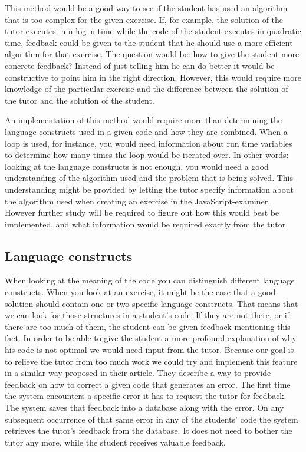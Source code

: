 \documentclass{article}
\begin{document}
This method would be a good way to see if the student has used an algorithm
that is too complex for the given exercise. If, for example, the solution of
the tutor executes in n-log~n time while the code of the student executes in
quadratic time, feedback could be given to the student that he should use a
more efficient algorithm for that exercise. The question would be: how to give
the student more concrete feedback? Instead of just telling him he can do
better it would be constructive to point him in the right direction. However,
this would require more knowledge of the particular exercise and the difference
between the solution of the tutor and the solution of the student.

An implementation of this method would require more than determining the
language constructs used in a given code and how they are combined. When a loop
is used, for instance, you would need information about run time variables to
determine how many times the loop would be iterated over. In other words:
looking at the language constructs is not enough, you would need a good
understanding of the algorithm used and the problem that is being solved. This
understanding might be provided by letting the tutor specify information about
the algorithm used when creating an exercise in the
JavaScript-examiner. However further study will be required to figure out how
this would best be implemented, and what information would be required exactly
from the tutor.

\subsection{Language constructs}

When looking at the meaning of the code you can distinguish different language
constructs. When you look at an exercise, it might be the case that a good
solution should contain one or two specific language constructs. That means
that we can look for those structures in a student's code. If they are not
there, or if there are too much of them, the student can be given feedback
mentioning this fact. In order to be able to give the student a more profound
explanation of why his code is not optimal we would need input from the
tutor. Because our goal is to relieve the tutor from too much work we could try
and implement this feature in a similar way \citet[Section
3.2]{watson2011learning} proposed in their article. They describe a way to
provide feedback on how to correct a given code that generates an error. The
first time the system encounters a specific error it has to request the tutor
for feedback. The system saves that feedback into a database along with the
error. On any subsequent occurrence of that same error in any of the students'
code the system retrieves the tutor's feedback from the database. It does not
need to bother the tutor any more, while the student receives valuable
feedback.
\end{document}
